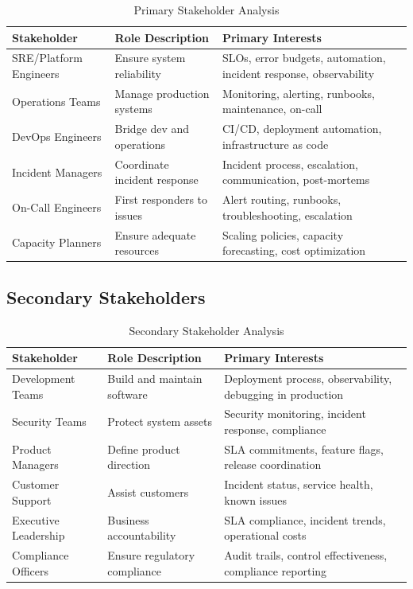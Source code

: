\documentclass[11pt,letterpaper]{article}
\begin{document}
\begin{table}[H]
\centering
\caption{Primary Stakeholder Analysis}
\small
\begin{tabular}{@{}L{2.6cm}L{3.6cm}L{7cm}@{}}
\toprule
\textbf{Stakeholder} & \textbf{Role Description} & \textbf{Primary Interests} \\
\midrule
SRE/Platform Engineers & Ensure system reliability & SLOs, error budgets, automation, incident response, observability \\
\addlinespace
Operations Teams & Manage production systems & Monitoring, alerting, runbooks, maintenance, on-call \\
\addlinespace
DevOps Engineers & Bridge dev and operations & CI/CD, deployment automation, infrastructure as code \\
\addlinespace
Incident Managers & Coordinate incident response & Incident process, escalation, communication, post-mortems \\
\addlinespace
On-Call Engineers & First responders to issues & Alert routing, runbooks, troubleshooting, escalation \\
\addlinespace
Capacity Planners & Ensure adequate resources & Scaling policies, capacity forecasting, cost optimization \\
\bottomrule
\end{tabular}
\end{table}

\subsection{Secondary Stakeholders}

\begin{table}[H]
\centering
\caption{Secondary Stakeholder Analysis}
\small
\begin{tabular}{@{}L{2.6cm}L{3.6cm}L{7cm}@{}}
\toprule
\textbf{Stakeholder} & \textbf{Role Description} & \textbf{Primary Interests} \\
\midrule
Development Teams & Build and maintain software & Deployment process, observability, debugging in production \\
\addlinespace
Security Teams & Protect system assets & Security monitoring, incident response, compliance \\
\addlinespace
Product Managers & Define product direction & SLA commitments, feature flags, release coordination \\
\addlinespace
Customer Support & Assist customers & Incident status, service health, known issues \\
\addlinespace
Executive Leadership & Business accountability & SLA compliance, incident trends, operational costs \\
\addlinespace
Compliance Officers & Ensure regulatory compliance & Audit trails, control effectiveness, compliance reporting \\
\bottomrule
\end{tabular}
\end{table}
\end{document}
